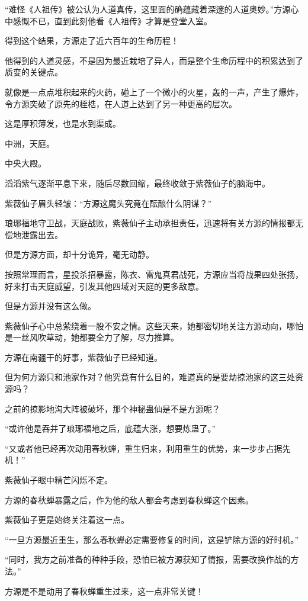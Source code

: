 \begin{this_body}
“难怪《人祖传》被公认为人道真传，这里面的确蕴藏着深邃的人道奥妙。”方源心中感慨不已，直到此刻他看《人祖传》才算是登堂入室。

得到这个结果，方源走了近六百年的生命历程！

他得到的人道灵感，不是因为最近栽培了异人，而是整个生命历程中的积累达到了质变的关键点。

就像是一点点堆积起来的火药，碰上了一个微小的火星，轰的一声，产生了爆炸，令方源突破了原先的桎梏，在人道上达到了另一种更高的层次。

这是厚积薄发，也是水到渠成。

中洲，天庭。

中央大殿。

滔滔紫气逐渐平息下来，随后尽数回缩，最终收敛于紫薇仙子的脑海中。

紫薇仙子眉头轻皱：“方源这魔头究竟在酝酿什么阴谋？”

琅琊福地守卫战，天庭战败，紫薇仙子主动承担责任，迅速将有关方源的情报都无偿地泄露出去。

但是方源方面，却十分诡异，毫无动静。

按照常理而言，星投杀招暴露，陈衣、雷鬼真君战死，方源应当将战果四处张扬，好来打击天庭威望，引发其他四域对天庭的更多敌意。

但是方源并没有这么做。

紫薇仙子心中总萦绕着一股不安之情。这些天来，她都密切地关注方源动向，哪怕是一丝风吹草动，她都要全力了解，尽力推算。

方源在南疆干的好事，紫薇仙子已经知道。

但为何方源只和池家作对？他究竟有什么目的，难道真的是要劫掠池家的这三处资源吗？

之前的掠影地沟大阵被破坏，那个神秘蛊仙是不是方源呢？

“或许他是吞并了琅琊福地之后，底蕴大涨，想要炼蛊了。”

“又或者他已经再次动用春秋蝉，重生归来，利用重生的优势，来一步步占据先机！”

紫薇仙子眼中精芒闪烁不定。

方源的春秋蝉暴露之后，作为他的敌人都会考虑到春秋蝉这个因素。

紫薇仙子更是始终关注着这一点。

“一旦方源最近重生，那么春秋蝉必定需要修复的时间，这是铲除方源的好时机。”

“同时，我方之前准备的种种手段，恐怕已被方源获知了情报，需要改换作战的方法。”

方源是不是动用了春秋蝉重生过来，这一点非常关键！


\end{this_body}

